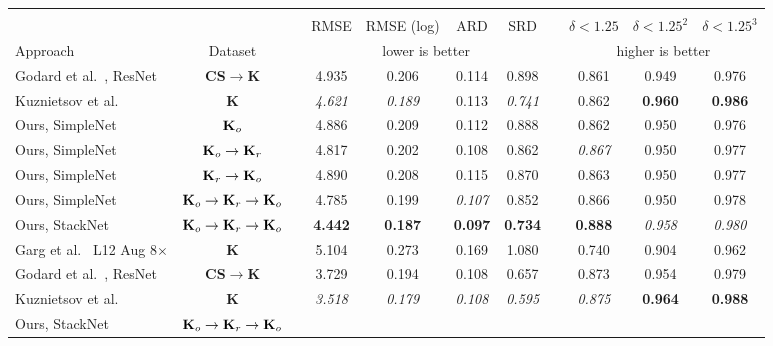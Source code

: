 \documentclass[runningheads]{llncs}
\begin{document}
\begin{table}[tb]
	\centering
	\tiny
	\begin{tabular}{lcccccccccc}
		\hline
		&&&&&&&&&&\\
		&    & &RMSE   & RMSE (log)   & ARD  & SRD  &  & $\delta < 1.25$ & 
		$\delta < 1.25^2$ & $\delta < 1.25^3$ \\ \cline{4-7} \cline{9-11} 
		Approach & Dataset &  & \multicolumn{4}{c}{lower is better} &  & 
		\multicolumn{3}{c}{higher is better} \\
		\hline
		Godard et al.~\cite{godard2016unsupervised}, ResNet  & 
		\textbf{CS}$\rightarrow$\textbf{K}&& 
		4.935 & 0.206 & 0.114 & 0.898 && 
		0.861 & 0.949 & 0.976 \\
		Kuznietsov et al.~\cite{kuznietsov2017semi} &\textbf{K}&& 
		\textit{4.621} & \textit{0.189} & 
		0.113 & \textit{0.741} && 
		0.862 & \textbf{0.960} & \textbf{0.986} \\
		Ours, SimpleNet  &$\text{\textbf{K}}_o$&& 4.886 & 0.209 & 
		0.112 & 
		0.888 && 
		0.862 & 0.950 & 0.976 \\
		Ours, SimpleNet 
		&$\text{\textbf{K}}_o\rightarrow\text{\textbf{K}}_r$&& 4.817 & 
		0.202 & 
		0.108 
		& 0.862 && 
		\textit{0.867} & 0.950 & 0.977 \\
		Ours, SimpleNet 
		&$\text{\textbf{K}}_r\rightarrow\text{\textbf{K}}_o$&& 4.890 & 
		0.208 & 
		0.115 
		& 0.870 && 
		0.863 & 0.950 & 0.977 \\
		Ours, SimpleNet  
		&$\text{\textbf{K}}_o\rightarrow\text{\textbf{K}}_r\rightarrow\text{\textbf{K}}_o$&&
		
		4.785 & 
		0.199 & \textit{0.107} & 
		0.852 && 
		0.866 & 0.950 & 0.978 \\
		Ours, StackNet 
		&$\text{\textbf{K}}_o\rightarrow\text{\textbf{K}}_r\rightarrow\text{\textbf{K}}_o$&&
		
		\textbf{4.442} & \textbf{0.187} & 
		\textbf{0.097} & \textbf{0.734} && 
		\textbf{0.888} & \textit{0.958} & \textit{0.980} \\
		\hline
		\hline
		Garg et al.~\cite{garg2016unsupervised} L12 Aug 8$\times$
		&\textbf{K}&& 
		5.104 & 0.273 & 0.169 & 1.080 
		&& 0.740 & 0.904 & 0.962 \\
		Godard et al.~\cite{godard2016unsupervised}, ResNet 
		&\textbf{CS}$\rightarrow$\textbf{K}&& 
		3.729 & 0.194 & 0.108 & 
		0.657 && 0.873 & 0.954 & 0.979 \\
		Kuznietsov et al.~\cite{kuznietsov2017semi} &\textbf{K}&& 
		\textit{3.518} & 
		\textit{0.179} & 
		\textit{0.108} & \textit{0.595} 
		&& \textit{0.875} & \textbf{0.964} & \textbf{0.988} \\
		Ours, StackNet
		&$\text{\textbf{K}}_o\rightarrow\text{\textbf{K}}_r\rightarrow\text{\textbf{K}}_o$&&
		

\end{tabular}
\end{table}
\end{document}
